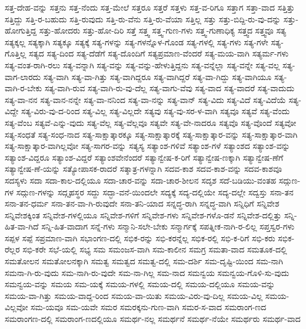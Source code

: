 {ಸತ್ತ-ದೇಹ-ವನ್ನು
ಸತ್ತನು
ಸತ್ತ-ನೆಂದು
ಸತ್ತ-ಮೇಲೆ
ಸತ್ತರೂ
ಸತ್ತರೆ
ಸತ್ತಳು
ಸತ್ತ-ವ-ರಿಗೂ
ಸತ್ತಾಗ
ಸತ್ತಾ-ವಾದ
ಸತ್ತಿತ್ತು
ಸತ್ತಿದ್ದು
ಸತ್ತಿ-ರ-ಬಹುದು
ಸತ್ತಿ-ರುವುದು
ಸತ್ತಿ-ರು-ವೆನು
ಸತ್ತಿ-ರು-ವೆಯಾ
ಸತ್ತಿಲ್ಲ
ಸತ್ತು
ಸತ್ತು-ಬಿದ್ದಿ-ರು-ವು-ದನ್ನು
ಸತ್ತು-ಹೋಗುತ್ತಿದ್ದ
ಸತ್ತು-ಹೋದರು
ಸತ್ತು-ಹೋ-ದಿರಿ
ಸತ್ತೆ
ಸತ್ತ್ವ
ಸತ್ತ್ವ-ಗುಣ-ಗಳು
ಸತ್ತ್ವ-ಗುಣಾಧಿಕ್ಯ
ಸತ್ತ್ವದ
ಸತ್ತ್ವವೂ
ಸತ್ಯ
ಸತ್ಯಕ್ಕಲ್ಲ
ಸತ್ಯಕ್ಕಾಗಿ
ಸತ್ಯಕ್ಕೂ
ಸತ್ಯಕ್ಕೆ
ಸತ್ಯ-ಗಳನ್ನು
ಸತ್ಯ-ಗಳನ್ನೊಳ-ಗೊಂಡ
ಸತ್ಯ-ಗಳಲ್ಲಿ
ಸತ್ಯ-ಗಳು
ಸತ್ಯ-ಗಳೇ
ಸತ್ಯ-ಗೊತ್ತಿಲ್ಲ
ಸತ್ಯದ
ಸತ್ಯ-ದಿಂದ
ಸತ್ಯ-ದೆಡೆಗೆ
ಸತ್ಯ-ದೊಂದಿಗೆ
ಸತ್ಯಪ್ರಮಾಣ-ವೆಂದರೆ
ಸತ್ಯ-ಮಯ-ವಾಗಿ
ಸತ್ಯರ್ಮ-ಗಳು
ಸತ್ಯ-ವಂತ-ರಾಗಿ-ರಲು
ಸತ್ಯ-ವನ್ನಾಗಿ
ಸತ್ಯ-ವನ್ನು
ಸತ್ಯ-ವನ್ನು-ಹೇಳುತ್ತಿದ್ದನು
ಸತ್ಯ-ವನ್ನೆಲ್ಲಾ
ಸತ್ಯ-ವನ್ನೇ
ಸತ್ಯ-ವಲ್ಲ
ಸತ್ಯ-ವಾಗ-ಲಾರದು
ಸತ್ಯ-ವಾಗಿ
ಸತ್ಯ-ವಾ-ಗಿತ್ತು
ಸತ್ಯ-ವಾಗಿದ್ದರೂ
ಸತ್ಯ-ವಾಗಿದ್ದರೆ
ಸತ್ಯ-ವಾ-ಗಿದ್ದು
ಸತ್ಯ-ವಾಗಿಯೂ
ಸತ್ಯ-ವಾಗಿ-ರ-ಬೇಕು
ಸತ್ಯ-ವಾಗಿ-ರುವ
ಸತ್ಯ-ವಾಗಿ-ರು-ವು-ದೆಲ್ಲ
ಸತ್ಯ-ವಾಗು-ವೆವು
ಸತ್ಯ-ವಾದ
ಸತ್ಯ-ವಾದರೆ
ಸತ್ಯ-ವಾದುದು
ಸತ್ಯ-ವಾ-ನನ
ಸತ್ಯ-ವಾನ-ನನ್ನೇ
ಸತ್ಯ-ವಾ-ನನಿಂದ
ಸತ್ಯ-ವಾ-ನನ್ನು
ಸತ್ಯ-ವಾನ್
ಸತ್ಯ-ವಿದು
ಸತ್ಯ-ವಿದೆ
ಸತ್ಯ-ವಿದೆಯೆ
ಸತ್ಯ-ವಿದ್ದೇ
ಸತ್ಯ-ವಿರು-ವು-ದ-ರಿಂದ
ಸತ್ಯ-ವಿಲ್ಲ
ಸತ್ಯ-ವಿಲ್ಲದೇ
ಸತ್ಯವು
ಸತ್ಯ-ವು-ಸರ-ಳ-ವಾಗಿ
ಸತ್ಯವೂ
ಸತ್ಯವೆ
ಸತ್ಯ-ವೆಂದು
ಸತ್ಯ-ವೆಂಬ
ಸತ್ಯವೆ-ಎನ್ನು-ವುದು
ಸತ್ಯ-ವೆಲ್ಲ
ಸತ್ಯ-ವೆಲ್ಲವೂ
ಸತ್ಯವೇ
ಸತ್ಯ-ವೇ-ನಾದರೂ
ಸತ್ಯವೊ
ಸತ್ಯ-ವೊಂದೆ
ಸತ್ಯವೋ
ಸತ್ಯ-ಸಂಧತೆ
ಸತ್ಯ-ಸಂಧ-ನಾದ
ಸತ್ಯ-ಸಾಕ್ಷಾತ್ಕಾರಕ್ಕೂ
ಸತ್ಯ-ಸಾಕ್ಷಾತ್ಕಾರಕ್ಕೆ
ಸತ್ಯ-ಸಾಕ್ಷಾತ್ಕಾರ-ವನ್ನು
ಸತ್ಯ-ಸಾಕ್ಷಾತ್ಕಾರ-ವಾಗಿ
ಸತ್ಯ-ಸಾಕ್ಷಾತ್ಕಾರ-ವಾಗಿಲ್ಲವೋ
ಸತ್ಯ-ಸಾಗರ-ವನ್ನು
ಸತ್ಯಸ್ಯ
ಸತ್ಯಾಂಶ-ಗಳಿವೆ
ಸತ್ಯಾಂಶ-ಗಳೆ
ಸತ್ಯಾಂಶದ
ಸತ್ಯಾಂಶ-ವನ್ನು
ಸತ್ಯಾಂಶ-ವಿದ್ದರೂ
ಸತ್ಯಾಂಶ-ವಿದ್ದರೆ
ಸತ್ಯಾಂಶವೇನೆಂದರೆ
ಸತ್ಯಾನ್ವೇಷ-ಕ-ರಿಗೆ
ಸತ್ಯಾನ್ವೇಷ-ಣಕ್ಕಾಗಿ
ಸತ್ಯಾನ್ವೇಷ-ಣೆಗೆ
ಸತ್ಯಾನ್ವೇಷ-ಣೆ-ಯನ್ನು
ಸತ್ಯೋಪಾಸಕ-ರಾದರೆ
ಸತ್ಶಾತ್ರ-ಗಳನ್ನಾಗಿ
ಸದವ-ಕಾಶ
ಸದವ-ಕಾಶ-ವನ್ನು
ಸದವ-ಕಾಶವೂ
ಸದಸ್ಯಳು
ಸದಾ
ಸದಾ-ಕಾಲ-ದಲ್ಲಿಯೂ
ಸದಾ-ಚಾರ-ವನ್ನು
ಸದಾ-ಚಾರ-ಶೀಲನ
ಸದೃಶ
ಸದೆ-ಬಡಿಯು-ವಂತಹ
ಸದ್ಗುಣ-ಗಳ
ಸದ್ಗುಣ-ಗಳನ್ನು
ಸದ್ಗೃಹಸ್ಥರ
ಸದ್ದು
ಸದ್ಭಾ-ವನೆ-ಯಿಂದಲೇ
ಸದ್ಯಕ್ಕೆ
ಸದ್ಯ-ದಲ್ಲಿಯೇ
ಸದ್ಯ-ದಲ್ಲೇ
ಸದ್ವಸ್ತು
ಸನಾ-ತನ
ಸನಾ-ತನ-ಧರ್ಮ
ಸನಾ-ತನ-ವಾ-ಗಿ-ರುವುದೇ
ಸನಾ-ತನಿ-ಯಾದ
ಸನ್ನದ್ಧ-ರಾಗಿ
ಸನ್ನದ್ಧ-ವಾಗಿ
ಸನ್ನಿಧಿಗೆ
ಸನ್ನಿವೇಶ
ಸನ್ನಿವೇಶಕ್ಕಿಂತ
ಸನ್ನಿವೇಶ-ಗಳಲ್ಲಿಯೂ
ಸನ್ನಿವೇಶ-ಗಳಿಗೆ
ಸನ್ನಿವೇಶ-ಗಳು
ಸನ್ನಿವೇಶ-ಗಳೊ-ಡನೆ
ಸನ್ನಿವೇಶ-ದಲ್ಲಿತ್ತು
ಸನ್ನಿ-ಹಿತ-ವಾ-ಗಿದೆ
ಸನ್ನಿ-ಹಿತ-ವಾದಾಗ
ಸನ್ನೆ-ಗಳು
ಸನ್ಮಾನಿ-ಸಲೇ-ಬೇಕು
ಸನ್ಮಾರ್ಗಕ್ಕೆ
ಸಪತ್ನೀಕ-ನಾಗಿ-ರ-ಲಿಲ್ಲ
ಸಪ್ತಸ್ವರ-ಗಳು
ಸಪ್ಪಳ
ಸಪ್ಪೆ
ಸಪ್ರಮಾಣ-ವಾಗಿ
ಸಭಾಂಗಣ-ದಲ್ಲಿ
ಸಭಿಕ-ರನ್ನು
ಸಭಿ-ಕರನ್ನೆಲ್ಲ
ಸಭಿಕ-ರಲ್ಲಿ
ಸಭಿ-ಕ-ರಿಗೆ
ಸಭಿ-ಕರು
ಸಭಿಕ-ರೆಲ್ಲರ
ಸಭಿ-ಕರೇ
ಸಭೆ-ಯಲ್ಲಿ
ಸಭ್ಯ
ಸಮ
ಸಮಂಜಸ-ವಾಗಿ
ಸಮ-ಕಾಲೀನ
ಸಮಗ್ರ
ಸಮತಾ-ವಾದ
ಸಮತೂಕ-ದಲ್ಲಿ
ಸಮತೋಲನ
ಸಮತೋಲನಕ್ಕಾಗಿ
ಸಮತ್ವ
ಸಮತ್ವದ
ಸಮತ್ವ-ದಲ್ಲಿ
ಸಮ-ದರ್ಶಿ
ಸಮ-ದೃಷ್ಟಿ-ಯಿಂದ
ಸಮ-ನಾಗಿ
ಸಮನಾ-ಗಿ-ರು-ವುದು
ಸಮ-ನಾಗಿ-ರು-ವುದೇ
ಸಮ-ನಾ-ಗಿಲ್ಲ
ಸಮ-ನಾದ
ಸಮನ್ವಯ
ಸಮನ್ವಯ-ಗೊಳಿ-ಸು-ವುದು
ಸಮನ್ವಯ-ವನ್ನು
ಸಮಯ
ಸಮ-ಯಕ್ಕೆ
ಸಮಯ-ಗಳಲ್ಲಿ
ಸಮಯ-ದಲ್ಲಿ
ಸಮಯ-ದಲ್ಲಿಯೂ
ಸಮಯ-ವನ್ನು
ಸಮಯ-ವಾ-ಗಿತ್ತು
ಸಮಯ-ವಾದ್ದ-ರಿಂದ
ಸಮಯ-ವಾ-ಯಿತು
ಸಮಯ-ವಿರು-ವು-ದಿಲ್ಲ
ಸಮಯ-ವಿಲ್ಲ
ಸಮಯ-ವಿಲ್ಲವೋ
ಸಮ-ಯವೂ
ಸಮ-ಯವೇ
ಸಮರ
ಸಮರಕ್ಕನು-ಗುಣ-ವಾಗಿ
ಸಮರ-ಸ-ವಾದ
ಸಮರಾಂಗ-ಣದ
ಸಮರಾಂಗಣ-ದಲ್ಲಿ
ಸಮರಾಂಗ-ಣದಲ್ಲಿಯೂ
ಸಮರ್ಥ-ನಲ್ಲ
ಸಮರ್ಥನೆ
ಸಮರ್ಥ-ನೆಯೇ
ಸಮರ್ಥರು
ಸಮರ್ಥ-ವಾದ
}
